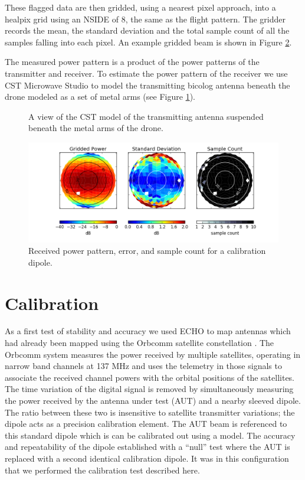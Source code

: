 \documentclass[preprint2,numberedappendix,tighten,twocolappendix]{aastex6}
\begin{document}
These flagged data are then gridded, using a nearest pixel approach, into a healpix grid using an NSIDE of 8, the same as the flight pattern.  The gridder records the mean, the standard deviation and the total sample count of all the samples falling into each pixel. An example gridded beam is shown in Figure \ref{fig:beam_std_count}.

The measured power pattern is a product of the power patterns of the transmitter and receiver. To estimate the power pattern of the receiver we use CST Microwave Studio to model the transmitting bicolog antenna beneath the drone modeled as a set of metal arms (see Figure \ref{fig:tx_cst}).  


\begin{figure}
\caption{A view of the CST model of the transmitting antenna suspended beneath the metal arms of the drone.}\label{fig:tx_cst}
\end{figure}


\begin{figure}[htb]
\begin{center}
\includegraphics[width=\textwidth]{figures/GB_power_rms_count.png}
\caption{Received power pattern, error, and sample count for a calibration dipole.}
\label{fig:beam_std_count}
\end{center}
\end{figure}

\section{Calibration}
As a first test of stability and accuracy we used ECHO to map antennas which had already been mapped using the Orbcomm satellite constellation .  The Orbcomm system measures the power received by multiple satellites, operating in narrow band channels at 137 MHz and uses the telemetry in those signals to associate the received channel powers with the orbital positions of the satellites.   The time variation of the digital signal is removed by simultaneously measuring the power received by the antenna under test (AUT) and a nearby sleeved dipole. The ratio between these two is insensitive to satellite transmitter variations; the dipole acts as a precision calibration element. The AUT beam is referenced to this standard dipole which is can be calibrated out using a model.  The accuracy and repeatability of the dipole established with a ``null'' test where the AUT is replaced with a second identical calibration dipole.  It was in this configuration that we performed the calibration test described here.
\end{document}
